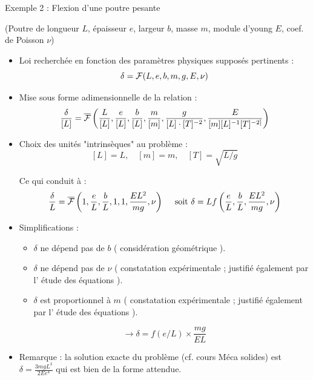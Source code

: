 \begin{frame}{ Exemple 2 : Flexion d'une poutre pesante} 

\small

(Poutre de longueur $L$, épaisseur $e$, largeur $b$, masse $m$, module d'young $E$, coef. de Poisson $\nu$)
\pause

\begin{itemize}

\item Loi recherchée en fonction des paramètres physiques supposés pertinents :
$$
 \delta = {\cal F} (L,e,b,m,g,E,\nu)
$$



\item  Mise sous forme adimensionnelle de la relation :
$$
\frac{\delta}{[L]} = \overline{\cal F} \left( \frac{L}{[L]},   \frac{e}{[L]},  \frac{b}{[L]}, \frac{m}{[m]},\frac{g}{[L] \cdot [T]^{-2}} ,\frac{E}{[m][L]^{-1} [T]^{-2]}} \right)
$$

\item Choix des unités "intrinsèques" au problème :
$$
[L] = L, \quad [m] = m , \quad [T] = \sqrt{L/g}
$$

Ce qui conduit à : 
$$
\frac{\delta}{L} = \overline{\cal F} \left( 1,  \frac{e}{L}, \frac{b}{L}, 1,1,\frac{E L^2}{m g}, \nu  \right) \quad \mbox{ soit }  
\delta = L f \left(  \frac{e}{L}, \frac{b}{L}, \frac{E L^2}{m g}, \nu 
\right)
$$


\item Simplifications : 

\begin{itemize}
\item $\delta$ ne dépend pas de $b$ ( {\color{purple} considération géométrique} ).
\item $\delta$ ne dépend pas de $\nu$ ( {\color{bleu} constatation expérimentale} ; justifié également par l'{\color{red} étude des équations} ).
\item $\delta$ est proportionnel à $m$ ( {\color{bleu} constatation expérimentale} ; justifié également par l'{\color{red} étude des équations} ).
\end{itemize}


$$ 
\longrightarrow \delta  = f(e/L) \times \frac{m g}{E L} 
$$


\item Remarque : la solution exacte du problème (cf. cours Méca solides) est $\delta =  \frac{ 3 m g L^3}{2 E e^4}$ qui est bien de la forme attendue. 


\end{itemize}


\end{frame}








